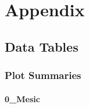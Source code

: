 \documentclass[
]{article}
\begin{document}
\hypertarget{appendix}{%
\section{Appendix}\label{appendix}}

\hypertarget{data-tables}{%
\subsection{Data Tables}\label{data-tables}}

\hypertarget{plot-summaries}{%
\subsubsection{Plot Summaries}\label{plot-summaries}}

\hypertarget{mesic-6}{%
\paragraph{0\_Mesic}\label{mesic-6}}
\end{document}
